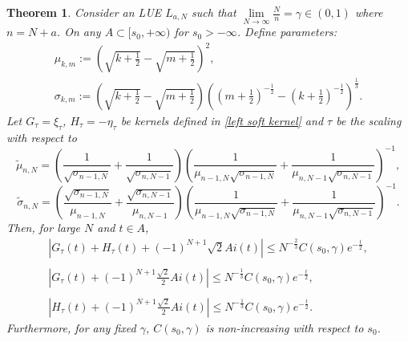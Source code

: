 \documentclass[11pt]{article}
\newtheorem{theorem}{Theorem}[section]
\numberwithin{equation}{section}%
\numberwithin{theorem}{section}
\begin{document}
\begin{theorem}\label{main left soft edge2}
 Consider an LUE $L_{a,N}$ such that $\lim\limits_{N\rightarrow\infty}\frac{N}{n}=\gamma\in(0,1)$ where $n=N+a$. On any $A\subset[s_0,+\infty)$ for $s_0>-\infty$. Define parameters:
    \begin{equation*}
      \begin{array}{ll}
      \mu_{k,m}:=\left(\sqrt{k+\frac{1}{2}}-\sqrt{m+\frac{1}{2}}\right)^2,\\
      \sigma_{k,m}:=\left(\sqrt{k+\frac{1}{2}}-\sqrt{m+\frac{1}{2}}\right)\left(\left(m+\frac{1}{2}\right)^{-\frac{1}{2}}-\left(k+\frac{1}{2}\right)^{-\frac{1}{2}}\right)^{\frac{1}{3}}.
      \end{array}
    \end{equation*}
    Let $G_\tau=\xi_\tau$, $H_\tau=-\eta_\tau$ be kernels defined in \eqref{left soft kernel} and $\tau$ be the scaling with respect to
\begin{equation*}
    \tilde{\mu}_{n,N}=\left(\frac{1}{\sqrt{\sigma_{n-1,N}}}+\frac{1}{\sqrt{\sigma_{n,N-1}}}\right)\left(\frac{1}{\mu_{n-1,N}\sqrt{\sigma_{n-1,N}}}+\frac{1}{\mu_{n,N-1}\sqrt{\sigma_{n,N-1}}}\right)^{-1},
\end{equation*}
\begin{equation*}
    \tilde{\sigma}_{n,N}=\left(\frac{\sqrt{\sigma_{n-1,N}}}{\mu_{n-1,N}}+\frac{\sqrt{\sigma_{n,N-1}}}{\mu_{n,N-1}}\right)\left(\frac{1}{\mu_{n-1,N}\sqrt{\sigma_{n-1,N}}}+\frac{1}{\mu_{n,N-1}\sqrt{\sigma_{n,N-1}}}\right)^{-1}.
\end{equation*}
Then, for large $N$ and $t\in A$,
   \begin{equation}\label{main2'}
\begin{array}{ll}
  |G_{\tau}(t)+H_{\tau}(t)+(-1)^{N+1}\sqrt2 Ai(t)|\le N^{-\frac{2}{3}}C(s_0,\gamma)e^{-\frac{t}{2}},\\
  \\
  \left|G_{\tau}(t)+(-1)^{N+1}\frac{\sqrt2}{2} Ai(t)\right|\le N^{-\frac{1}{3}}C(s_0,\gamma)e^{-\frac{t}{2}},\\
  \\
  \left|H_{\tau}(t)+(-1)^{N+1}\frac{\sqrt2}{2} Ai(t)\right|\le N^{-\frac{1}{3}}C(s_0,\gamma)e^{-\frac{t}{2}}.
\end{array}
\end{equation}
Furthermore, for any fixed $\gamma$, $C(s_0,\gamma)$ is non-increasing with respect to $s_0$.
\end{theorem}
\end{document}
